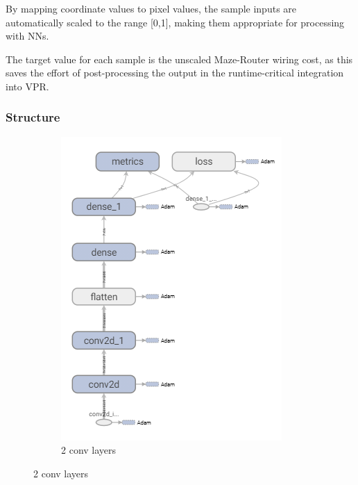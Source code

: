 By mapping coordinate values to pixel values, the sample inputs are automatically scaled to the range [0,1], making them appropriate for processing with \glspl{NN}.

The target value for each sample is the unscaled Maze-Router wiring cost, as this saves the effort of post-processing the output in the runtime-critical integration into \gls{VPR}.

\subsubsection{Structure}\label{ch:cnn-design}

\begin{figure}
	\centering
	\begin{subfigure}[b]{0.3\linewidth}
		\includegraphics[width=\linewidth]{plots/cnn-candidates-2-conv.png}
		\caption{2 conv layers}
	\end{subfigure}

\end{figure}
